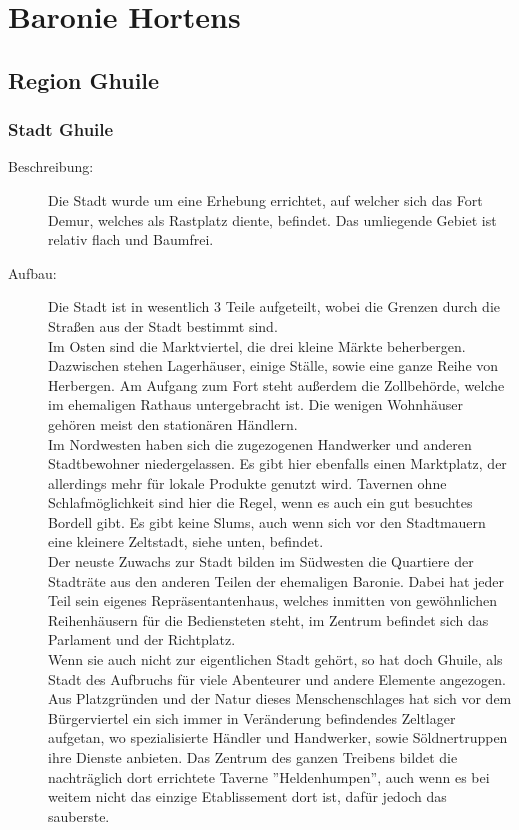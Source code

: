 \documentclass[a4paper,12pt,oneside]{book}
\begin{document}
\section{Baronie Hortens}

\subsection{Region Ghuile}

\subsubsection{Stadt Ghuile}
\begin{description}
\item[Beschreibung:]Die Stadt wurde um eine Erhebung errichtet, auf welcher sich das Fort Demur, welches als Rastplatz diente, befindet. Das umliegende Gebiet ist relativ flach und Baumfrei. 
\item[Aufbau:]Die Stadt ist in wesentlich 3 Teile aufgeteilt, wobei die Grenzen durch die Straßen aus der Stadt bestimmt sind. \\Im Osten sind die Marktviertel, die drei kleine Märkte beherbergen. Dazwischen stehen Lagerhäuser, einige Ställe, sowie eine ganze Reihe von Herbergen. Am Aufgang zum Fort steht außerdem die Zollbehörde, welche im ehemaligen Rathaus untergebracht ist. Die wenigen Wohnhäuser gehören meist den stationären Händlern. 
\\Im Nordwesten haben sich die zugezogenen Handwerker und anderen Stadtbewohner niedergelassen. Es gibt hier ebenfalls einen Marktplatz, der allerdings mehr für lokale Produkte genutzt wird. Tavernen ohne Schlafmöglichkeit sind hier die Regel, wenn es auch ein gut besuchtes Bordell gibt. Es gibt keine Slums, auch wenn sich vor den Stadtmauern eine kleinere Zeltstadt, siehe unten, befindet.
\\Der neuste Zuwachs zur Stadt bilden im Südwesten die Quartiere der Stadträte aus den anderen Teilen der ehemaligen Baronie. Dabei hat jeder Teil sein eigenes Repräsentantenhaus, welches inmitten von gewöhnlichen Reihenhäusern für die Bediensteten steht, im Zentrum befindet sich das Parlament und der Richtplatz.
\\Wenn sie auch nicht zur eigentlichen Stadt gehört, so hat doch Ghuile, als Stadt des Aufbruchs für viele Abenteurer und andere Elemente angezogen. Aus Platzgründen und der Natur dieses Menschenschlages hat sich vor dem Bürgerviertel ein sich immer in Veränderung befindendes Zeltlager aufgetan, wo spezialisierte Händler und Handwerker, sowie Söldnertruppen ihre Dienste anbieten. Das Zentrum des ganzen Treibens bildet die nachträglich dort errichtete Taverne ''Heldenhumpen'', auch wenn es bei weitem nicht das einzige Etablissement dort ist, dafür jedoch das sauberste. 

\end{description}
\end{document}
